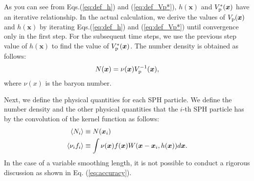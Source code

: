 \documentclass[]{aastex631}
\begin{document}
As you can see from Eqs.(\ref{eq:def_h}) and (\ref{eq:def_Vp*}), $h(\bm{x})$ and $V^*_{\rm p}(\bm{x})$ have an iterative relationship.
In the actual calculation, we derive the values of $V_{\rm p}(\bm{x})$ and $h(\bm{x})$ by iterating Eqs.(\ref{eq:def_h}) and (\ref{eq:def_Vp*}) until convergence only in the first step.  For the subsequent time steps, we use the previous step value of $h(\bm{x})$ to find the value of $V^*_{\rm p}(\bm{x})$.
The number density is obtained as follows:
\begin{align}
    \label{eq:N(x)}
    N(\bm{x})=\nu(\bm{x}) V_{\rm p}^{-1}(\bm{x}),
\end{align}
where $\nu(x)$ is the baryon number.

Next, we define the physical quantities for each SPH particle.
We define the number density and the other physical quantities that the $i$-th SPH particle has by the convolution of the kernel function as follows:
\begin{align}
    \ev{N_i}&\equiv N(\bm{x}_i)\\
    \label{eq:convolution}
    \ev{\nu_if_i}&\equiv \int \nu(\bm{x})f(\bm{x})W(\bm{x}-\bm{x}_i,h(\bm{x}))d\bm{x}.
\end{align}
In the case of a variable smoothing length, it is not possible to conduct a rigorous discussion as shown in Eq. (\ref{eq:accuracy}).
\end{document}
